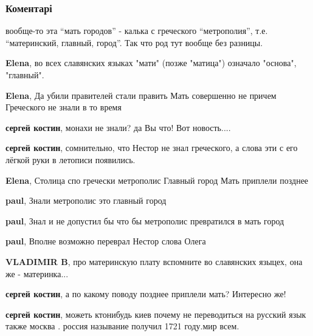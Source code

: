  
 
 
 
 
\subsubsection{Коментарі}

\begin{itemize} %

вообще-то эта \enquote{мать городов} - калька с греческого \enquote{метрополия}, т.е.
\enquote{материнский, главный, город}. Так что род тут вообще без разницы.

\begin{itemize} %
\textbf{Elena}, во всех славянских языках "мати" (позже "матица") означало "основа", "главный".

\textbf{Elena}, Да убили правителей стали править Мать совершенно не причем Греческого не знали в то время

\textbf{сергей костин}, монахи не знали? да Вы что! Вот новость....

\textbf{сергей костин}, сомнительно, что Нестор не знал греческого, а слова эти с его лёгкой руки в летописи появились.

\textbf{Elena}, Столица спо гречески метрополис Главный город Мать приплели позднее

\textbf{paul}, Знали метрополис это главный город

\textbf{paul}, Знал и не допустил бы что бы метрополис превратился в мать город

\textbf{paul}, Вполне возможно переврал Нестор слова Олега

\textbf{VLADIMIR B}, про материнскую плату вспомните во славянских языцех, она же - материнка...

\textbf{сергей костин}, а по какому поводу позднее приплели мать? Интересно же!

\textbf{сергей костин}, можеть ктонибудь киев почему не переводиться на русский язык также москва . россия называние получил 1721 году.мир всем.
\end{itemize} %


\end{itemize}
